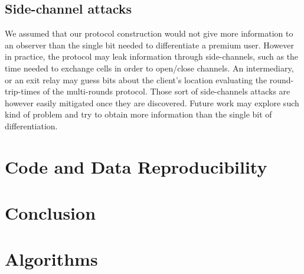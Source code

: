 \documentclass[sigconf, anonymous]{acmart}
\begin{document}
\subsection{Side-channel attacks}
We assumed that our protocol construction would not give more information to an observer than the single bit needed to differentiate a premium user. However in practice, the protocol may leak information through side-channels, such as the time needed to exchange cells in order to open/close channels. An intermediary, or an exit relay may guess bits about the client's location evaluating the round-trip-times of the multi-rounds protocol. Those sort of side-channels attacks are however easily mitigated once they are discovered. Future work may explore such kind of problem and try to obtain more information than the single bit of differentiation.

\section{Code and Data Reproducibility}
\label{sec:code}

\section{Conclusion}
\label{sec:conclusion}



\appendix

\section{Algorithms}
\label{sec:algorithms}

\end{document}
